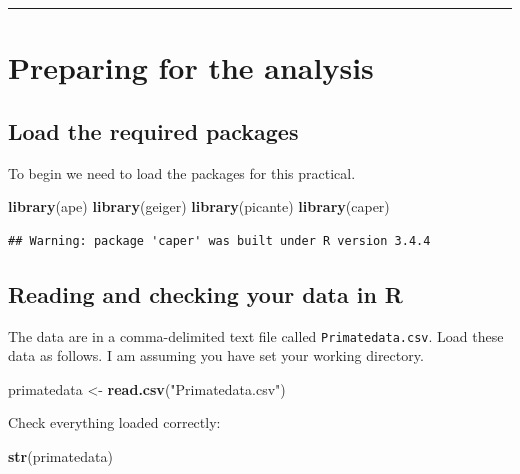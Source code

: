 \documentclass[]{book}
\newenvironment{Shaded}{\begin{snugshade}}{\end{snugshade}}
\newcommand{\KeywordTok}[1]{\textcolor[rgb]{0.13,0.29,0.53}{\textbf{{#1}}}}
\newcommand{\StringTok}[1]{\textcolor[rgb]{0.31,0.60,0.02}{{#1}}}
\newcommand{\NormalTok}[1]{{#1}}
\theoremstyle{definition}
\theoremstyle{definition}
\theoremstyle{definition}
\theoremstyle{remark}
\begin{document}
\begin{center}\rule{0.5\linewidth}{\linethickness}\end{center}

\section{Preparing for the analysis}\label{preparing-for-the-analysis}

\subsection{Load the required
packages}\label{load-the-required-packages}

To begin we need to load the packages for this practical.

\begin{Shaded}
\begin{Highlighting}[]
\KeywordTok{library}\NormalTok{(ape)}
\KeywordTok{library}\NormalTok{(geiger)}
\KeywordTok{library}\NormalTok{(picante)}
\KeywordTok{library}\NormalTok{(caper)}
\end{Highlighting}
\end{Shaded}

\begin{verbatim}
## Warning: package 'caper' was built under R version 3.4.4
\end{verbatim}

\subsection{Reading and checking your data in
R}\label{reading-and-checking-your-data-in-r}

The data are in a comma-delimited text file called
\texttt{Primatedata.csv}. Load these data as follows. I am assuming you
have set your working directory.

\begin{Shaded}
\begin{Highlighting}[]
\NormalTok{primatedata <-}\StringTok{ }\KeywordTok{read.csv}\NormalTok{(}\StringTok{"Primatedata.csv"}\NormalTok{)}
\end{Highlighting}
\end{Shaded}

Check everything loaded correctly:

\begin{Shaded}
\begin{Highlighting}[]
\KeywordTok{str}\NormalTok{(primatedata)}
\end{Highlighting}
\end{Shaded}
\end{document}
